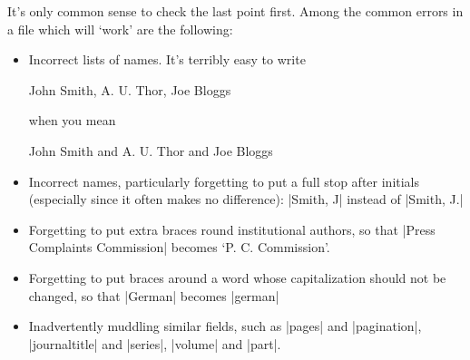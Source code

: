 It's only common sense to check the last point first. Among the common
errors in a file which will `work' are the following:
\begin{itemize}
 \item Incorrect lists of names. It's terribly easy to write
 \begin{pseudoverb}
John Smith, A. U. Thor, Joe Bloggs
 \end{pseudoverb}
 when you mean
 \begin{pseudoverb}
John Smith and A. U. Thor and Joe Bloggs
\end{pseudoverb}
\item Incorrect names, particularly forgetting to put a full stop
  after initials (especially since it often makes no difference):
  |Smith, J| instead of |Smith, J.|
\item Forgetting to put extra braces round institutional authors, so
  that |Press Complaints Commission| becomes `P. C. Commission'.
 \item Forgetting to put braces around a word whose capitalization should not be changed, so that |German| becomes |german|
 \item Inadvertently muddling similar fields, such as |pages| and
   |pagination|, |journaltitle| and |series|, |volume| and |part|.
\end{itemize}

